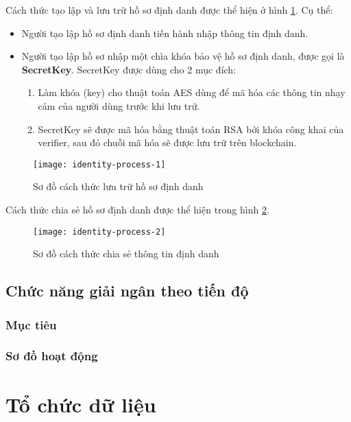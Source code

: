 \documentclass[../main-report.tex]{subfiles}
\begin{document}
Cách thức tạo lập và lưu trữ hồ sơ định danh được thể hiện ở hình \ref{fig:identity-process-1}. Cụ thể:

\begin{itemize}
\item Người tạo lập hồ sơ định danh tiến hành nhập thông tin định danh.
\item Người tạo lập hồ sơ nhập một chìa khóa bảo vệ hồ sơ định danh, được gọi là \textbf{SecretKey}. SecretKey được dùng cho 2 mục đích:
\begin{enumerate}[label=(\roman*)]
\item Làm khóa (key) cho thuật toán AES dùng để mã hóa các thông tin nhạy cảm của người dùng trước khi lưu trữ.
\item SecretKey sẽ được mã hóa bằng thuật toán RSA bởi khóa công khai của verifier, sau đó chuỗi mã hóa sẽ được lưu trữ trên \gls{blockchain}.
\end{enumerate}
\end{itemize}

\begin{figure}[ht!]
\begin{center}
\label{fig:identity-process-1}
\texttt{[image: identity-process-1]}
\caption{Sơ đồ cách thức lưu trữ hồ sơ định danh}
\end{center}
\end{figure}

Cách thức chia sẻ hồ sơ định danh được thể hiện trong hình \ref{fig:identity-process-2}.

\begin{figure}[ht!]
\begin{center}
\label{fig:identity-process-2}
\texttt{[image: identity-process-2]}
\caption{Sơ đồ cách thức chia sẻ thông tin định danh}
\end{center}
\end{figure}

\subsection{Chức năng giải ngân theo tiến độ}
\subsubsection{Mục tiêu}

\subsubsection{Sơ đồ hoạt động}

\section{Tổ chức dữ liệu}
\end{document}
